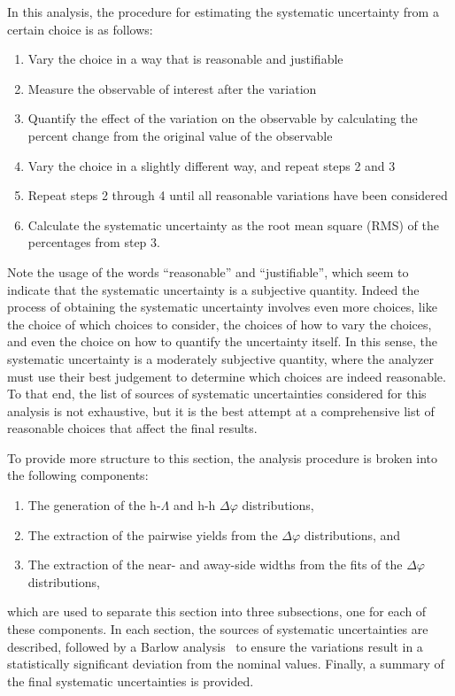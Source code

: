 In this analysis, the procedure for estimating the systematic uncertainty from a certain choice is as follows:
%
\begin{enumerate}
    \item Vary the choice in a way that is reasonable and justifiable 
    \item Measure the observable of interest after the variation
    \item Quantify the effect of the variation on the observable by calculating the percent change from the original value of the observable
    \item Vary the choice in a slightly different way, and repeat steps 2 and 3
    \item Repeat steps 2 through 4 until all reasonable variations have been considered
    \item Calculate the systematic uncertainty as the root mean square (RMS) of the percentages from step 3.
\end{enumerate}
%
Note the usage of the words ``reasonable'' and ``justifiable'', which seem to indicate that the systematic uncertainty is a subjective quantity. Indeed the process of obtaining the systematic uncertainty involves even more choices, like the choice of which choices to consider, the choices of how to vary the choices, and even the choice on how to quantify the uncertainty itself. In this sense, the systematic uncertainty is a moderately subjective quantity, where the analyzer must use their best judgement to determine which choices are indeed reasonable. To that end, the list of sources of systematic uncertainties considered for this analysis is not exhaustive, but it is the best attempt at a comprehensive list of reasonable choices that affect the final results. 

To provide more structure to this section, the analysis procedure is broken into the following components:
%
\begin{enumerate}
\item The generation of the h-$\Lambda$ and h-h $\Delta\varphi$ distributions,
\item The extraction of the pairwise yields from the $\Delta\varphi$ distributions, and 
\item The extraction of the near- and away-side widths from the fits of the $\Delta\varphi$ distributions,
\end{enumerate}
%
which are used to separate this section into three subsections, one for each of these components. In each section, the sources of systematic uncertainties are described, followed by a Barlow analysis~\cite{BarlowCheck} to ensure the variations result in a statistically significant deviation from the nominal values. Finally, a summary of the final systematic uncertainties is provided.

